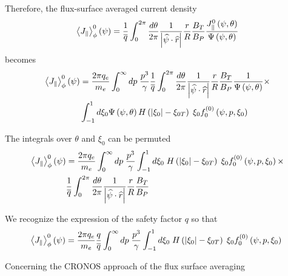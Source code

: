 \documentclass[12pt,a4paper]{article}
\begin{document}
Therefore, the flux-surface averaged current density 
\begin{equation}
\left\langle J_{\Vert}\right\rangle _{\phi}^{0}\left( \psi\right) =\frac {1}{%
\overline{q}}\int_{0}^{2\pi}\frac{d\theta}{2\pi}\frac{1}{\left| \widehat{\psi%
}\cdot\widehat{r}\right| }\frac{r}{R}\frac{B_{T}}{B_{P}}\frac{
J_{\Vert}^{0}\left( \psi,\theta\right) }{\Psi\left( \psi ,\theta\right) }
\end{equation}
becomes 
\begin{align}
\left\langle J_{\Vert}\right\rangle _{\phi}^{0}\left( \psi\right) & =\frac{
2\pi q_{e}}{m_{e}}\int_{0}^{\infty}dp\;\frac{p^{3}}{\gamma}\frac {1}{%
\overline{q}}\int_{0}^{2\pi}\frac{d\theta}{2\pi}\frac{1}{\left| \widehat{\psi%
}\cdot\widehat{r}\right| }\frac{r}{R}\frac{B_{T}}{B_{P}}\frac {1}{\Psi\left(
\psi,\theta\right) }\times  \nonumber \\
& \int_{-1}^{1}d\xi_{0}\Psi\left( \psi,\theta\right) H\left( \left|
\xi_{0}\right| -\xi_{0T}\right) \;\xi_{0}f_{0}^{(0)}\left( \psi,p,\xi
_{0}\right)
\end{align}

The integrals over $\theta $ and $\xi _{0}$ can be permuted 
\begin{align}
\left\langle J_{\Vert }\right\rangle _{\phi }^{0}\left( \psi \right) & =%
\frac{2\pi q_{e}}{m_{e}}\int_{0}^{\infty }dp\;\frac{p^{3}}{\gamma }%
\int_{-1}^{1}d\xi _{0}\;H\left( \left\vert \xi _{0}\right\vert -\xi
_{0T}\right) \;\xi _{0}f_{0}^{(0)}\left( \psi ,p,\xi _{0}\right) \times  
\nonumber \\
& \frac{1}{\overline{q}}\int_{0}^{2\pi }\frac{d\theta }{2\pi }\frac{1}{%
\left\vert \widehat{\psi }\cdot \widehat{r}\right\vert }\frac{r}{R}\frac{%
B_{T}}{B_{P}}
\end{align}

We recognize the expression of the safety factor $q$ so that 
\begin{equation}
\left\langle J_{\Vert }\right\rangle _{\phi }^{0}\left( \psi \right) =\frac{%
2\pi q_{e}}{m_{e}}\frac{q}{\overline{q}}\int_{0}^{\infty }dp\;\frac{p^{3}}{%
\gamma }\int_{-1}^{1}d\xi _{0}\;H\left( \left\vert \xi _{0}\right\vert -\xi
_{0T}\right) \;\xi _{0}f_{0}^{(0)}\left( \psi ,p,\xi _{0}\right) \;
\end{equation}

Concerning the CRONOS approach of the flux surface averaging
\end{document}
